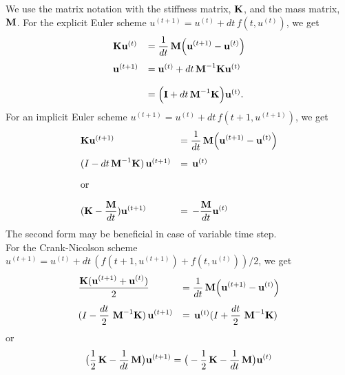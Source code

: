 We use the matrix notation with the stiffness matrix, $\textbf{K}$, and the mass matrix, $\textbf{M}$. For the explicit Euler scheme $u^{(t+1)} = u^{(t)} + dt\,f(t,u^{(t)})$, we get 
\begin{equation*}
  \begin{array}{lll}
    \textbf{K}\textbf{u}^{(t)} &= \displaystyle\frac{\displaystyle{1}}{\displaystyle{dt}}\, \textbf{M}\Big(\textbf{u}^{(t+1)} - \textbf{u}^{(t)}\Big)\\[4mm]
    \textbf{u}^{(t+1)} &= \textbf{u}^{(t)} + dt \,\textbf{M}^{-1}\textbf{K}\textbf{u}^{(t)}\\[4mm]
                 &= \Big(\textbf{I} + dt \,\textbf{M}^{-1}\textbf{K}\Big)\textbf{u}^{(t)}
                .
  \end{array}
\end{equation*}
For an implicit Euler scheme $u^{(t+1)} = u^{(t)} + dt\,f(t+1,u^{(t+1)})$, we get 
\begin{equation*}
  \begin{array}{lll}
    \textbf{K}\textbf{u}^{(t+1)} &= \displaystyle\frac{\displaystyle{1}}{\displaystyle{dt}}\, \textbf{M}\Big(\textbf{u}^{(t+1)} - \textbf{u}^{(t)}\Big)\\[4mm]
     (I - dt\,\textbf{M}^{-1}\textbf{K})\,\textbf{u}^{(t+1)}&= \,\textbf{u}^{(t)}\\[1em] \textrm{or}\\[1em]
     \displaystyle(\textbf{K}-\frac{\textbf{M}}{dt})\textbf{u}^{(t+1)}&=\,\displaystyle -\frac{\textbf{M}}{dt}\textbf{u}^{(t)}
  \end{array}
\end{equation*}
The second form may be beneficial in case of variable time step.\\[1em]
For the Crank-Nicolson scheme $u^{(t+1)} = u^{(t)} + dt\,(f(t+1,u^{(t+1)})+f(t,u^{(t)}))/2$, we get
\begin{equation*}
	\begin{array}{lll}
		\displaystyle\frac{\displaystyle{\textbf{K}(\textbf{u}^{(t+1)}+\textbf{u}^{(t)})}}{\displaystyle{2}}\, &= \displaystyle\frac{\displaystyle{1}}{\displaystyle{dt}}\, \textbf{M}\Big(\textbf{u}^{(t+1)} - \textbf{u}^{(t)}\Big)\\[4mm]
		(I - \displaystyle\frac{\displaystyle{dt}}{\displaystyle{2}}\,\,\textbf{M}^{-1}\textbf{K})\,\textbf{u}^{(t+1)}&= \,\textbf{u}^{(t)}(I + \displaystyle\frac{\displaystyle{dt}}{\displaystyle{2}}\,\,\textbf{M}^{-1}\textbf{K})
	\end{array}
\end{equation*} 
or
\begin{equation*}
  \begin{array}{lll}
    \big(\displaystyle\frac{\displaystyle{1}}{\displaystyle{2}}\,\textbf{K}-\displaystyle\frac{\displaystyle{1}}{\displaystyle{dt}}\,\textbf{M}\big) \textbf{u}^{(t+1)} = \big(-\displaystyle\frac{\displaystyle{1}}{\displaystyle{2}}\,{\textbf{K}} - \displaystyle\frac{\displaystyle{1}}{\displaystyle{dt}}\,\textbf{M}\big) \textbf{u}^{(t)}
  \end{array}
\end{equation*}
